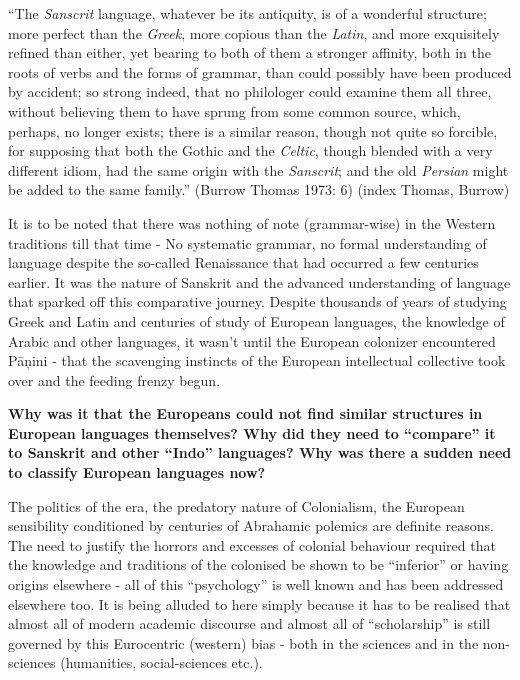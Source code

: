 \vskip 4pt

\begin{myquote}
“The \textit{Sanscrit} language, whatever be its antiquity, is of a wonderful structure; more perfect than the \textit{Greek}, more copious than the \textit{Latin}, and more exquisitely refined than either, yet bearing to both of them a stronger affinity, both in the roots of verbs and the forms of grammar, than could possibly have been produced by accident; so strong indeed, that no philologer could examine them all three, without believing them to have sprung from some common source, which, perhaps, no longer exists; there is a similar reason, though not quite so forcible, for supposing that both the Gothic and the \textit{Celtic}, though blended with a very different idiom, had the same origin with the \textit{Sanscrit}; and the old \textit{Persian} might be added to the same family.” (Burrow Thomas 1973: 6) (index Thomas, Burrow)
\end{myquote}

\vskip 4pt

It is to be noted that there was nothing of note (grammar-wise) in the Western traditions till that time - No systematic grammar, no formal understanding of language despite the so-called Renaissance that had occurred a few centuries earlier. It was the nature of Sanskrit and the advanced understanding of language that sparked off this comparative journey. Despite thousands of years of studying Greek and Latin and centuries of study of European languages, the knowledge of Arabic and other languages, it wasn’t until the European colonizer encountered Pāņini - that the scavenging instincts of the European intellectual collective took over and the feeding frenzy begun.

\vskip 4pt

\textbf{Why was it that the Europeans could not find similar structures in European languages themselves? Why did they need to “compare” it to Sanskrit and other “Indo” languages? Why was there a sudden need to classify European languages now?}

The politics of the era, the predatory nature of Colonialism, the European sensibility conditioned by centuries of Abrahamic polemics are definite reasons. The need to justify the horrors and excesses of colonial behaviour required that the knowledge and traditions of the colonised be shown to be “inferior” or having origins elsewhere - all of this “psychology” is well known and has been addressed elsewhere too. It is being alluded to here simply because it has to be realised that almost all of modern academic discourse and almost all of “scholarship” is still governed by this Eurocentric (western) bias - both in the sciences and in the non-sciences (humanities, social-sciences etc.).

